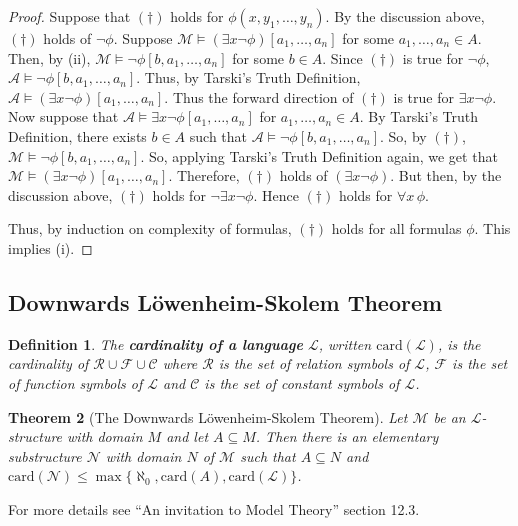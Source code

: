 \documentclass[11pt]{article}
\newtheorem{theorem}{Theorem}[section]
\newtheorem{definition}[theorem]{Definition}
\newcommand{\mcal}[1]{\mathcal{#1}}
\begin{document}
\begin{proof}
Suppose that $(\dagger)$ holds for $\phi(x,y_1,\ldots,y_n)$. By the discussion above, $(\dagger)$ holds of $\neg\phi$. Suppose $\mcal{M}\models (\exists x\neg\phi)[a_1,\ldots,a_n]$ for some $a_1,\ldots,a_n\in A$. Then, by (ii), $\mcal{M}\models \neg\phi[b,a_1,\ldots,a_n]$ for some $b\in A$. Since $(\dagger)$ is true for $\neg\phi$, $\mcal{A}\models\neg\phi[b,a_1,\ldots,a_n]$. Thus, by Tarski's Truth Definition, $\mcal{A}\models (\exists x \neg\phi)[a_1,\ldots,a_n]$. Thus the forward direction of $(\dagger)$ is true for $\exists x \neg\phi$. Now suppose that $\mcal{A}\models\exists x \neg\phi[a_1,\ldots,a_n]$ for $a_1,\ldots,a_n\in A$. By Tarski's Truth Definition, there exists $b\in A$ such that $\mcal{A}\models \neg\phi[b,a_1,\ldots,a_n]$. So, by $(\dagger)$, $\mcal{M}\models \neg\phi[b,a_1,\ldots,a_n]$. So, applying Tarski's Truth Definition again, we get that $\mcal{M}\models (\exists x\neg\phi)[a_1,\ldots,a_n]$. Therefore, $(\dagger)$ holds of $(\exists x\neg\phi)$. But then, by the discussion above, $(\dagger)$ holds for $\neg\exists x \neg\phi$. Hence $(\dagger)$ holds for $\forall x \,\phi$.

Thus, by induction on complexity of formulas, $(\dagger)$ holds for all formulas $\phi$. This implies (i).
\end{proof}

\subsection{Downwards L\"owenheim-Skolem Theorem}

\begin{definition}
The \textbf{cardinality of a language} $\mcal{L}$, written $\textrm{card}(\mcal{L})$, is the cardinality of $\mcal{R}\cup\mcal{F}\cup \mcal{C}$ where $\mcal{R}$ is the set of relation symbols of $\mcal{L}$, $\mcal{F}$ is the set of function symbols of $\mcal{L}$ and $\mcal{C}$ is the set of constant symbols of $\mcal{L}$.
\end{definition}

\begin{theorem}[The Downwards L\"owenheim-Skolem Theorem]
Let $\mcal{M}$ be an $\mcal{L}$-structure with domain $M$ and let $A\subseteq M$.
Then there is an elementary substructure $\mcal{N} $ with domain $N$ of $\mcal{M} $ such that
$A\subseteq N$ and
$\textrm{card} (\mcal{N} )\leq \max\{\aleph_0,\textrm{card} (A),\textrm{card} (\mcal{L})\}$.
\end{theorem}

For more details see ``An invitation to Model Theory'' section 12.3.
\end{document}
